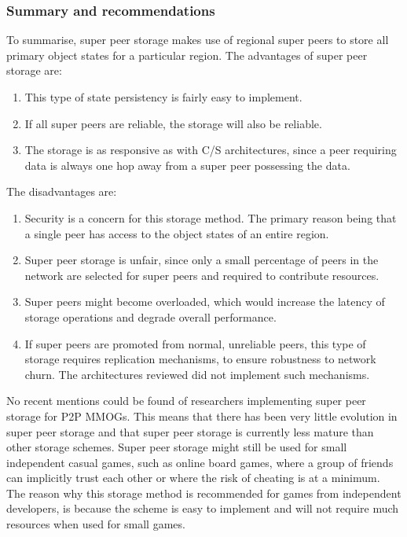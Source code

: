 \documentclass[10pt,a4paper,journal,cspaper,compsoc]{IEEEtran}
\begin{document}
\subsubsection{Summary and recommendations}

To summarise, super peer storage makes use of regional super peers to store all primary object states for a particular region. The advantages of
super peer storage are:
%
\begin{enumerate}
    \item This type of state persistency is fairly easy to implement.
    \item If all super peers are reliable, the storage will also be reliable.
    \item The storage is as responsive as with C/S architectures, since a peer requiring data is always one hop away from a super peer possessing
        the data.
\end{enumerate}

The disadvantages are:
%
\begin{enumerate}
    \item Security is a concern for this storage method. The primary reason being that a single peer has access to the object states of an entire
        region.
    \item Super peer storage is unfair, since only a small percentage of peers in the network are selected for super peers and required to
        contribute resources.
    \item Super peers might become overloaded, which would increase the latency of storage operations and degrade overall performance.
    \item If super peers are promoted from normal, unreliable peers, this type of storage requires replication mechanisms, to ensure robustness
        to network churn. The architectures reviewed did not implement such mechanisms.
\end{enumerate}

No recent mentions could be found of researchers implementing super peer storage for P2P MMOGs. This means that there has been very little evolution
in super peer storage and that super peer storage is currently less mature than other storage schemes. Super peer storage might still be used for
small independent casual games, such as online board games, where a group of friends can implicitly trust each other or where the risk of cheating is
at a minimum. The reason why this storage method is recommended for games from independent developers, is because the scheme is easy to implement and
will not require much resources when used for small games.
\end{document}

